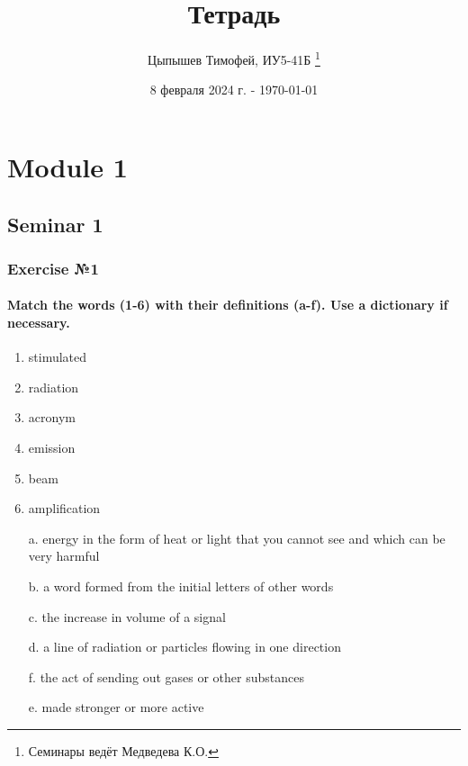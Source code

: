 \documentclass[12pt, a4paper]{report}
\title{Тетрадь}
\author{Цыпышев Тимофей, ИУ5-41Б \thanks{Семинары ведёт Медведева К.О.}}
\date{8 февраля 2024 г. - \today}
\begin{document}
\maketitle
\tableofcontents


\part{Module 1}


\chapter{Seminar 1}

\section{Exercise №1}

\subsection*{Match the words (1-6) with their definitions (a-f).
    Use a dictionary if necessary.}
\begin{enumerate}
    \item stimulated
    \item radiation
    \item acronym
    \item emission
    \item beam
    \item amplification \\
\end{enumerate}

\begin{enumerate}
    \item[a.] energy in the form of heat or light that you cannot see and
        which can be very harmful
    \item[b.] a word formed from the initial letters of other words
    \item[c.] the increase in volume of a signal
    \item[d.] a line of radiation or particles flowing in one direction
    \item[f.] the act of sending out gases or other substances
    \item[e.] made stronger or more active
\end{enumerate}
\end{document}
